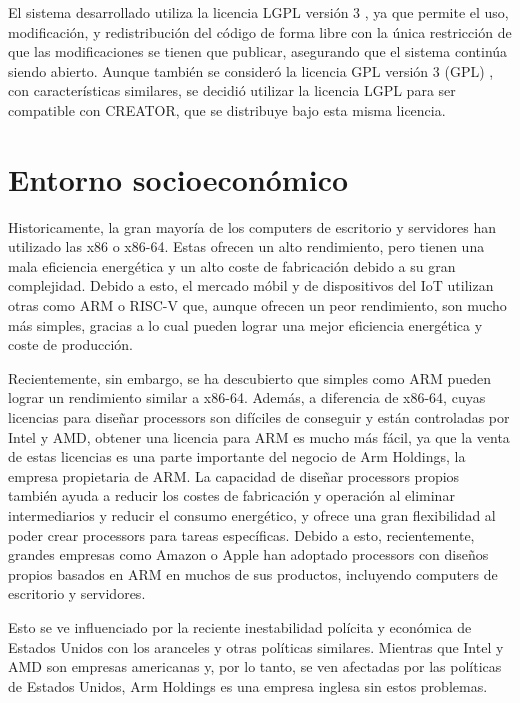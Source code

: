 El sistema desarrollado utiliza la licencia \gls{LGPL} versión 3
\parencite{lgpl}, ya que permite el uso, modificación, y redistribución del
código de forma libre con la única restricción de que las modificaciones se
tienen que publicar, asegurando que el sistema continúa siendo abierto. Aunque
también se consideró la licencia \gls{GPL} versión 3 (GPL) \parencite{gpl}, con
características similares, se decidió utilizar la licencia LGPL para ser
compatible con CREATOR, que se distribuye bajo esta misma licencia.

\section{Entorno socioeconómico}\label{sec:environment}

Historicamente, la gran mayoría de los \glspl{computer} de escritorio y
servidores han utilizado las  x86 o x86-64. Estas
 ofrecen un alto rendimiento, pero tienen una mala
eficiencia energética y un alto coste de fabricación debido a su gran
complejidad. Debido a esto, el mercado móbil y de dispositivos del \gls{IoT}
utilizan otras  como ARM o RISC-V que, aunque
ofrecen un peor rendimiento, son mucho más simples, gracias a lo cual pueden
lograr una mejor eficiencia energética y coste de producción.

Recientemente, sin embargo, se ha descubierto que 
simples como ARM pueden lograr un rendimiento similar a x86-64. Además, a
diferencia de x86-64, cuyas licencias para diseñar \glspl{processor} son
difíciles de conseguir y están controladas por Intel y AMD, obtener una licencia
para ARM es mucho más fácil, ya que la venta de estas licencias es una parte
importante del negocio de Arm Holdings, la empresa propietaria de ARM. La
capacidad de diseñar \glspl{processor} propios también ayuda a reducir los
costes de fabricación y operación al eliminar intermediarios y reducir el
consumo energético, y ofrece una gran flexibilidad al poder crear
\glspl{processor} para tareas específicas. Debido a esto, recientemente, grandes
empresas como Amazon o Apple han adoptado \glspl{processor} con diseños propios
basados en ARM en muchos de sus productos, incluyendo \glspl{computer} de
escritorio y servidores.

Esto se ve influenciado por la reciente inestabilidad polícita y económica de
Estados Unidos con los aranceles y otras políticas similares. Mientras que Intel
y AMD son empresas americanas y, por lo tanto, se ven afectadas por las
políticas de Estados Unidos, Arm Holdings es una empresa inglesa sin estos
problemas.

